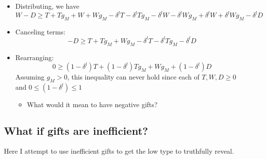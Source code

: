 \documentclass[12pt]{article}
\newcommand{\de}{\delta}
\begin{document}
\begin{itemize}
		\item Distributing, we have 
			\[
					W - D \geq T + Tg_M + W + Wg_M - \de^l T - \de^l Tg_M - \de^l W - \de^l Wg_M + \de^l W + \de^l Wg_M - \de^l D
			\]
				\item Canceling terms:
			\[
					- D \geq T + Tg_M + Wg_M - \de^l T - \de^l Tg_M - \de^l D
			\]
		\item Rearranging:
			\[
					0 \geq \left(1 - \de^l \right) T + \left(1 - \de^l \right) Tg_M + Wg_M + \left(1 - \de^l \right) D
			\]
			Assuming $g_M > 0$, this inequality can never hold since each of $T,W,D\geq0$ and $0 \leq \left(1 - \de^l \right) \leq 1$	
			\begin{itemize}
				\item What would it mean to have negative gifts?
			\end{itemize}					
		\end{itemize}


\subsection{What if gifts are inefficient?}
\label{sec:eless}
Here I attempt to use inefficient gifts to get the low type to truthfully reveal.\\
\end{document}
